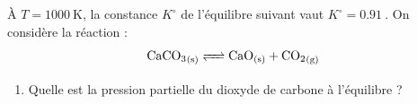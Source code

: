\documentclass[a4paper,french,bookmarks]{book}
\begin{document}
    \subsection{}
    
    \subsection{}
    
    À $T= \qty{1000}{\kelvin}$, la constance $K^\circ$ de l'équilibre suivant vaut $K^\circ = \qty{0.91}{}$. On considère la réaction :
    \[ {\text{Ca}\text C\text O_3}_\text{(s)} \xrightleftharpoons{\hspace{0.4cm}} {\text{Ca}\text O}_\text{(s)} + {\text C\text O_2}_\text{(g)}\]
    
    \begin{enumerate}
        \item Quelle est la pression partielle du dioxyde de carbone à l'équilibre ?
        
        
        
    \end{enumerate}

    \subsection{}
\end{document}
